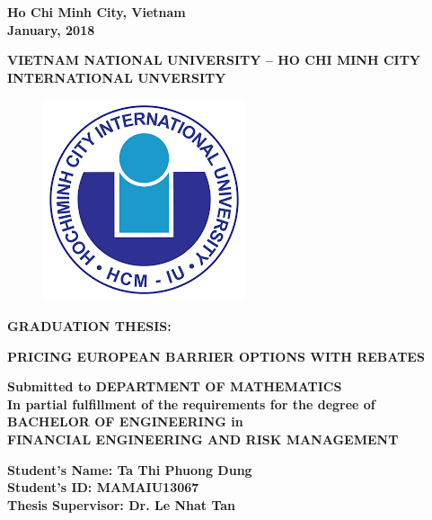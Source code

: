 \documentclass[12pt,a4paper,left=2cm,right=2cm,oneside,titlepage]{report}
\numberwithin{equation}{section}
\begin{document}
\vspace{4.4cm}

\begin{center}
	\fontsize{12pt}{18pt}\selectfont \textbf{Ho Chi Minh City, Vietnam \\
    January, 2018}
\end{center}

\newpage
{}
\begin{center}
	\fontsize{12pt}{18pt}\selectfont \textbf{VIETNAM NATIONAL UNIVERSITY – HO CHI MINH CITY\\
		INTERNATIONAL UNVERSITY} \vspace{0.8cm}
	
	\begin{figure}[htp]
		\begin{center}
			\includegraphics[scale=.6]{logo}
		\end{center}
		\label{reflogo}
	\end{figure}	
	\begin{center}
		\fontsize{12pt}{18pt}\selectfont \textbf{GRADUATION THESIS:} \\ \vspace{36pt}
		
		\fontsize{14pt}{16pt}\selectfont \textbf{PRICING EUROPEAN BARRIER OPTIONS WITH REBATES} \\ \vspace{2pt}
		
		\fontsize{12pt}{18pt}\selectfont \textbf{Submitted to DEPARTMENT OF MATHEMATICS \\
			In partial fulfillment of the requirements for the degree of \\
			BACHELOR OF ENGINEERING in\\ 
			FINANCIAL ENGINEERING AND RISK MANAGEMENT} \\ \vspace{18pt}
		
		\fontsize{12pt}{18pt}\selectfont \textbf{Student’s Name:	Ta Thi Phuong Dung\\
			Student’s ID:	MAMAIU13067\\
			Thesis Supervisor:	Dr. Le Nhat Tan}
		
	\end{center}
\end{center}
\end{document}
